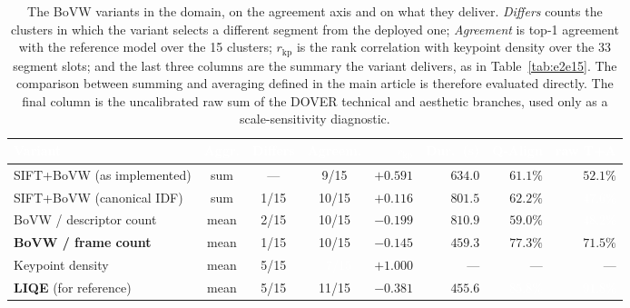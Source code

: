 \documentclass[sn-basic,Numbered]{sn-jnl}
\newcommand{\pfA}[1]{\cellcolor{perf5}\textcolor{white}{\textbf{#1}}}
\newcommand{\pfB}[1]{\cellcolor{perf4}#1}
\newcommand{\pfC}[1]{\cellcolor{perf3}#1}
\newcommand{\pfD}[1]{\cellcolor{perf2}#1}
\newcommand{\pfE}[1]{\cellcolor{perf1}\textcolor{white}{#1}}
\newcommand{\hd}[1]{\textcolor{white}{\textbf{#1}}}
\begin{document}
\begin{table}[!ht]
\centering
\caption{The BoVW variants in the domain, on the agreement axis and on what they
deliver. \emph{Differs} counts the clusters in which the variant selects a
different segment from the deployed one; \emph{Agreement} is top-1 agreement with
the reference model over the 15 clusters; $r_{\mathrm{kp}}$ is the rank
correlation with keypoint density over the 33 segment slots; and the last three
columns are the summary the variant delivers, as in Table~\ref{tab:e2e15}. The
comparison between summing and averaging defined in the main article is
therefore evaluated directly. The final column is the uncalibrated raw sum of
the DOVER technical and aesthetic branches, used only as a scale-sensitivity
diagnostic.}
\label{tab:variants}
\footnotesize
\setlength{\tabcolsep}{3.5pt}
\renewcommand{\arraystretch}{1.14}
\begin{tabular}{@{}l c c c r r r r@{}}
\toprule
\rowcolor{headerblue}
\hd{Variant} & \hd{Aggr.} & \hd{Differs} & \hd{Agreem.} &
\hd{$r_{\mathrm{kp}}$} & \hd{Dur.\ (s)} & \hd{Q-Align} & \hd{raw T+A} \\
\midrule
\rowcolor{catbovw!12} SIFT+BoVW (as implemented) & sum & --- & \pfD{9/15} & $+0.591$ & $634.0$ & \pfC{$61.1\%$} & \pfD{$52.1\%$} \\
\rowcolor{rowwhite} SIFT+BoVW (canonical IDF)  & sum & 1/15 & \pfC{10/15} & $+0.116$ & $801.5$ & \pfC{$62.2\%$} & \pfE{$47.6\%$} \\
\rowcolor{rowlight} BoVW / descriptor count    & mean & 2/15 & \pfC{10/15} & $-0.199$ & $810.9$ & \pfC{$59.0\%$} & \pfE{$48.2\%$} \\
\rowcolor{perf4!22} \textbf{BoVW / frame count} & mean & 1/15 & \pfC{10/15} & $-0.145$ & $\mathbf{459.3}$ & \pfB{$\mathbf{77.3\%}$} & \pfB{$\mathbf{71.5\%}$} \\
\midrule
\rowcolor{rowlight} Keypoint density           & mean & 5/15 & \pfE{\ \,7/15} & $+1.000$ & --- & --- & --- \\
\rowcolor{perf5!16} \textbf{LIQE} (for reference) & mean & 5/15 & \pfB{11/15} & $-0.381$ & $455.6$ & \pfA{$85.8\%$} & \pfA{$91.8\%$} \\
\bottomrule
\end{tabular}
\end{table}
\end{document}
